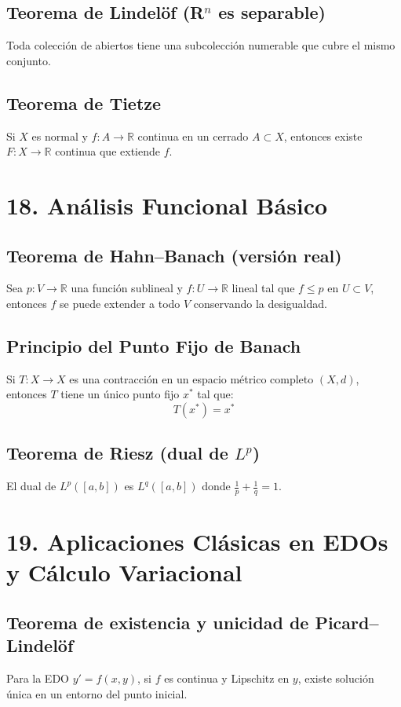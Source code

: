 \documentclass[12pt]{article}
\begin{document}
\subsection{Teorema de Lindelöf (R\(^{n}\) es separable)}
Toda colección de abiertos tiene una subcolección numerable que cubre el mismo conjunto.

\subsection{Teorema de Tietze}
Si \(X\) es normal y \(f: A \to \mathbb{R}\) continua en un cerrado \(A \subset X\), entonces existe \(F: X \to \mathbb{R}\) continua que extiende \(f\).

\section{18. Análisis Funcional Básico}

\subsection{Teorema de Hahn–Banach (versión real)}
Sea \(p: V \to \mathbb{R}\) una función sublineal y \(f: U \to \mathbb{R}\) lineal tal que \(f \leq p\) en \(U \subset V\), entonces \(f\) se puede extender a todo \(V\) conservando la desigualdad.

\subsection{Principio del Punto Fijo de Banach}
Si \(T: X \to X\) es una contracción en un espacio métrico completo \((X, d)\), entonces \(T\) tiene un único punto fijo \(x^*\) tal que:
\[
T(x^*) = x^*
\]

\subsection{Teorema de Riesz (dual de \(L^p\))}
El dual de \(L^p([a,b])\) es \(L^q([a,b])\) donde \(\frac{1}{p} + \frac{1}{q} = 1\).

\section{19. Aplicaciones Clásicas en EDOs y Cálculo Variacional}

\subsection{Teorema de existencia y unicidad de Picard–Lindelöf}
Para la EDO \(y' = f(x, y)\), si \(f\) es continua y Lipschitz en \(y\), existe solución única en un entorno del punto inicial.
\end{document}
